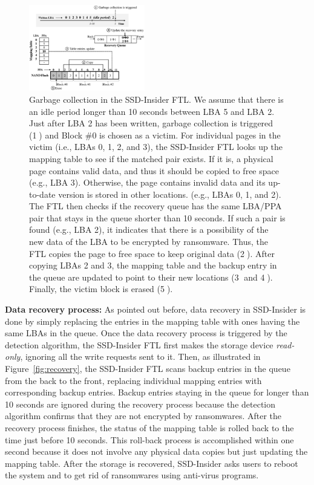 \documentclass[conference]{IEEEtran}
\newcommand{\ours}{SSD-Insider}
\begin{document}
\begin{figure}
\centering
\includegraphics[width=0.45\textwidth]{fig/flash-fig4}
\caption{
Garbage collection in the \ours{} FTL. We assume that there is
an idle period longer than 10 seconds between LBA 5 and LBA 2. Just
after LBA 2 has been written, garbage collection is triggered
(\textcircled{1}) and Block \#0 is chosen as a victim. For
individual pages in the victim (i.e., LBAs 0, 1, 2, and 3), the
\ours{} FTL looks up the mapping table to see if the matched
pair exists.  If it is, a physical page contains valid data, and
thus it should be copied to free space (e.g., LBA 3).  Otherwise,
the page contains invalid data and its up-to-date version is stored
in other locations. (e.g., LBAs 0, 1, and 2).  The FTL then checks
if the recovery queue has the same LBA/PPA pair that stays in the
queue shorter than 10 seconds.  If such a pair is found (e.g., LBA
2), it indicates that there is a possibility of the new data of the
LBA to be encrypted by ransomware.  Thus, the FTL copies the page
to free space to keep original data (\textcircled{2}).  After
copying LBAs 2 and 3, the mapping table and the backup entry in the
queue are updated to point to their new locations (\textcircled{3}
and \textcircled{4}).  Finally, the victim block is erased
(\textcircled{5}).
}
\label{fig:gc}
\end{figure}


{\bf Data recovery process:} 
As pointed out before, data recovery in \ours{} is done by
simply replacing the entries in the mapping table with ones having the same LBAs
in the queue.  Once the data recovery process is
triggered by the detection algorithm, the \ours{} FTL first makes the
storage device \textit{read-only}, ignoring all the write requests
sent to it.  Then, as illustrated in Figure~\ref{fig:recovery}, the
\ours{} FTL scans backup entries in the queue from the back to
the front, replacing individual mapping entries with corresponding
backup entries.  Backup entries staying in the queue for longer
than 10 seconds are ignored during the recovery process because the
detection algorithm confirms that they are not encrypted by
ransomwares.  After the recovery process finishes, the status of
the mapping table is rolled back to the time just before 10
seconds.  This roll-back process is accomplished within one second
because it does not involve any physical data copies but just updating the mapping table. 
After the storage is recovered, \ours{} asks users to reboot the system
and to get rid of ransomwares using anti-virus programs.
\end{document}
